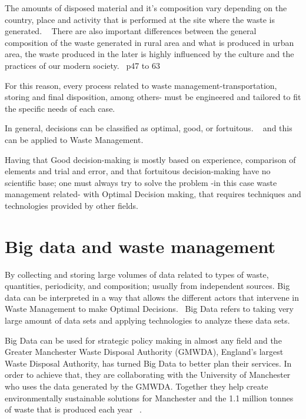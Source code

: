 \documentclass[sigconf]{acmart}
\begin{document}
The amounts of disposed material and it's composition vary depending on the country, place and activity that is performed at the site where the waste is generated. ~\cite{chandrappa2012} 
There are also important differences between the general composition of the waste generated in rural area and what is produced in urban area, the waste produced in the later is highly influenced by the culture and the practices of our modern society.~\cite{chandrappa2012} p47 to 63

For this reason, every process related to waste management-transportation, storing and final disposition, among others- must be engineered and tailored to fit the specific needs of each case.



In general, decisions can be classified as optimal, good, or fortuitous. ~\cite{akbarpour2016} and this can be applied to Waste Management.

Having that Good decision-making is mostly based on experience, comparison of elements and trial and error, and that fortuitous decision-making have no scientific base; one must always try to solve the problem -in this case waste management related- with Optimal Decision making, that requires techniques and technologies provided by other fields. 
 ~\cite{akbarpour2016}


\section{ Big data and waste management}
By collecting and storing large volumes of  data related to types of waste, quantities, periodicity, and composition; usually from independent sources. Big data can be interpreted in a way that allows the different actors that intervene in Waste Management to make Optimal Decisions.~\cite{yenkar2014review} Big Data refers to taking very large amount of data sets and applying technologies to analyze these data sets.

Big Data can be used for strategic policy making in almost any field and the Greater Manchester Waste Disposal Authority (GMWDA), England's largest Waste Disposal Authority, has turned Big Data to better plan their services. In order to achieve that, they are collaborating with the University of Manchester who uses the data generated by the GMWDA. Together they help create environmentally sustainable solutions for Manchester and the 1.1 million tonnes of waste that is produced each year ~\cite{markvan2016}. 
\end{document}
